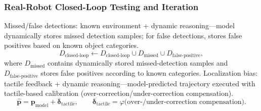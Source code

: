 \documentclass[12pt,a4paper]{article}
\begin{document}
\subsubsection{Real-Robot Closed-Loop Testing and Iteration}
Missed/false detections: known environment + dynamic reasoning---model dynamically stores missed detection samples; for false detections, stores false positives based on known object categories.
\begin{equation}
D_{\mathrm{closed\text{-}loop}}\leftarrow D_{\mathrm{closed\text{-}loop}}\cup D_{\mathrm{missed}}\cup D_{\mathrm{false\text{-}positive}},
\label{eq:closed-loop-detect}
\end{equation}
where $D_{\mathrm{missed}}$ contains dynamically stored missed-detection samples and $D_{\mathrm{false\text{-}positive}}$ stores false positives according to known categories.
Localization bias: tactile feedback + dynamic reasoning---model-predicted trajectory executed with tactile-based calibration (over-correction/under-correction compensation).
\begin{equation}
\hat{\mathbf{p}}=\mathbf{p}_{\mathrm{model}}+\boldsymbol{\delta}_{\mathrm{tactile}},\qquad
\boldsymbol{\delta}_{\mathrm{tactile}}=\varphi\bigl(\text{over-/under-correction compensation}\bigr).
\label{eq:localization-bias}
\end{equation}
\end{document}
